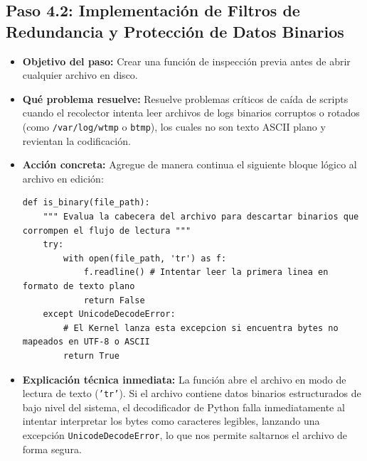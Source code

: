 \documentclass[
  coursetitle={Cómputo Nube y Tecnologías Emergentes},
  coursehours={96},
  coursedate={Verano 2026},
  doctype={Guía de Laboratorio Práctico},
  otherlangs={english,french},
  authorname={Lázaro},
  authorsurname={Bustio-Martínez},
  authortitle={PhD},
  role={Profesor Investigador},
  email={lbustio@inaoe.mx},
  phone={5559504000},
  ext={7459},
  institution={Instituto Nacional de Astrofísica, Óptica y Electrónica (INAOE)},
  department={Maestría en Ciencias en Tecnologías de Seguridad},
  address={Luis Enrique Erro 1, Sta. Ma. Tonantzintla, San Andrés Cholula, CP 72840, Puebla, México},
  margin={0.5in}
]{../../lbustio_lecture_notes}
\begin{document}
\subsection{Paso 4.2: Implementación de Filtros de Redundancia y Protección de Datos Binarios}
\begin{itemize}
    \item \textbf{Objetivo del paso:} Crear una función de inspección previa antes de abrir cualquier archivo en disco.
    \item \textbf{Qué problema resuelve:} Resuelve problemas críticos de caída de scripts cuando el recolector intenta leer archivos de logs binarios corruptos o rotados (como \texttt{/var/log/wtmp} o \texttt{btmp}), los cuales no son texto ASCII plano y revientan la codificación.
    \item \textbf{Acción concreta:} Agregue de manera continua el siguiente bloque lógico al archivo en edición:
\begin{verbatim}
def is_binary(file_path):
    """ Evalua la cabecera del archivo para descartar binarios que corrompen el flujo de lectura """
    try:
        with open(file_path, 'tr') as f:
            f.readline() # Intentar leer la primera linea en formato de texto plano
            return False
    except UnicodeDecodeError:
        # El Kernel lanza esta excepcion si encuentra bytes no mapeados en UTF-8 o ASCII
        return True
\end{verbatim}
    \item \textbf{Explicación técnica inmediata:} La función abre el archivo en modo de lectura de texto (\texttt{'tr'}). Si el archivo contiene datos binarios estructurados de bajo nivel del sistema, el decodificador de Python falla inmediatamente al intentar interpretar los bytes como caracteres legibles, lanzando una excepción \texttt{UnicodeDecodeError}, lo que nos permite saltarnos el archivo de forma segura.
\end{itemize}
\end{document}
